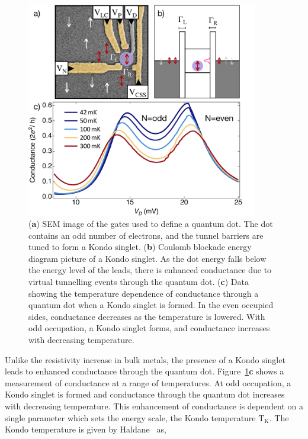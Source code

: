  \begin{figure}[!hbt]
 \begin{center}
\includegraphics[width=0.9\textwidth]{figures/ch2/figure12.pdf}
\caption[Kondo Effect in a Strongly Coupled Quantum Dot]{\label{fig:ch2/kondo_regime_conductance} 
(\textbf{a}) SEM image of the gates used to define a quantum dot. The dot contains an odd number of electrons, and the tunnel barriers are tuned to form a Kondo singlet. (\textbf{b}) Coulomb blockade energy diagram picture of a Kondo singlet. As the dot energy falls below the energy level of the leads, there is enhanced conductance due to virtual tunnelling events through the quantum dot. (\textbf{c}) Data showing the temperature dependence of conductance through a quantum dot when a Kondo singlet is formed. In the even occupied sides, conductance decreases as the temperature is lowered. With odd occupation, a Kondo singlet forms, and conductance increases with decreasing temperature.}
 \end{center}
\end{figure}



 Unlike the resistivity increase in bulk metals, the presence of a Kondo singlet leads to enhanced conductance through the quantum dot. Figure~\ref{fig:ch2/kondo_regime_conductance}\textbf{c} shows a measurement of conductance at a range of temperatures. At odd occupation, a Kondo singlet is formed and conductance through the quantum dot increases with decreasing temperature. This enhancement of conductance is dependent on a single parameter which sets the energy scale, the Kondo temperature $\mathrm{T_K}$. The Kondo temperature is given by Haldane~\cite{Haldane1978, kondo_thesis_stuttgart} as,
 

